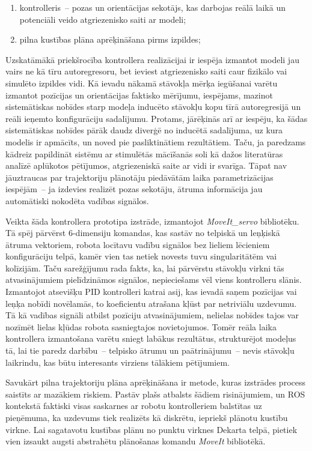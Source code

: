 \documentclass[12pt, a4paper]{article}
\numberwithin{equation}{section} %
\begin{document}
\begin{enumerate}
    \item kontrolleris~-- pozas un orientācijas sekotājs, kas darbojas reālā laikā un potenciāli veido atgriezenisko saiti ar modeli;
    \item pilna kustības plāna aprēķināšana pirms izpildes;
\end{enumerate}

Uzskatāmākā priekšrocība kontrollera realizācijai ir iespēja izmantot modeli jau vairs ne kā tīru autoregresoru, bet ieviest atgriezenisko saiti caur fizikālo vai simulēto izpildes vidi. Kā ievadu nākamā stāvokļa mērķa iegūšanai varētu izmantot pozīcijas un orientācijas faktisko mērījumu, iespējams, mazinot sistemātiskas nobīdes starp modeļa inducēto stāvokļu kopu tīrā autoregresijā un reāli ieņemto konfigurāciju sadalījumu. Protams, jārēķinās arī ar iespēju, ka šādas sistemātiskas nobīdes pārāk daudz diverģē no inducētā sadalījuma, uz kura modelis ir apmācīts, un noved pie pasliktinātiem rezultātiem. Taču, ja paredzams kādreiz papildināt sistēmu ar stimulētās mācīšanās soli kā dažos literatūras analīzē aplūkotos pētījumos, atgriezeniskā saite ar vidi ir svarīga. Tāpat nav jāuztraucas par trajektoriju plānotāju piedāvātām laika parametrizācijas iespējām~-- ja izdevies realizēt pozas sekotāju, ātruma informācija jau automātiski nokodēta vadības signālos.

Veikta šāda kontrollera prototipa izstrāde, izmantojot \textit{MoveIt\_servo} bibliotēku. Tā spēj pārvērst 6-dimensiju komandas, kas sastāv no telpiskā un leņķiskā ātruma vektoriem, robota locītavu vadību signālos bez lieliem lēcieniem konfigurāciju telpā, kamēr vien tas netiek novests tuvu singularitātēm vai kolīzijām. Taču sarežģījumu rada fakts, ka, lai pārvērstu stāvokļu virkni tās atvasinājumiem pielīdzināmos signālos, nepieciešams vēl viens kontrolleru slānis. Izmantojot atsevišķu PID kontrolleri katrai asij, kas ievadā saņem pozīcijas vai leņķa nobīdi novēlamās, to koeficientu atrašana kļūst par netriviālu uzdevumu. Tā kā vadības signāli atbilst pozīciju atvasinājumiem, nelielas nobīdes tajos var nozīmēt lielas kļūdas robota sasniegtajos novietojumos. Tomēr reāla laika kontrollera izmantošana varētu sniegt labākus rezultātus, strukturējot modeļus tā, lai tie paredz darbību~-- telpisko ātrumu un paātrinājumu~-- nevis stāvokļu laikrindu, kas būtu interesants virziens tālākiem pētījumiem.

Savukārt pilna trajektoriju plāna aprēķināšana ir metode, kuras izstrādes process saistīts ar mazākiem riskiem. Pastāv plašs atbalsts šādiem risinājumiem, un ROS kontekstā faktiski visas saskarnes ar robotu kontrolleriem balstītas uz pieņēmuma, ka uzdevums tiek realizēts kā diskrētu, iepriekš plānotu kustību virkne. Lai sagatavotu kustības plānu no punktu virknes Dekarta telpā, pietiek vien izsaukt augsti abstrahētu plānošanas komandu \textit{MoveIt} bibliotēkā. 
\end{document}
